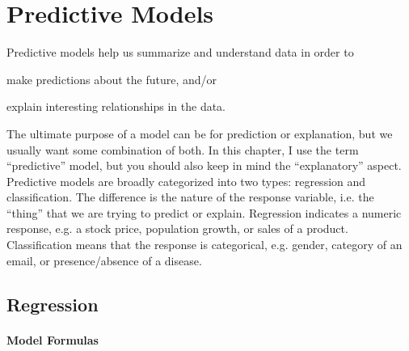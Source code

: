 \chapter{Predictive Models}
Predictive models help us summarize and understand data in order to
\begin{inparaenum}[1)] \item
make predictions about the future, and/or \item explain interesting
relationships in the data. 
\end{inparaenum}
The ultimate purpose of a model can be for
prediction or explanation, but we usually want some combination of
both. In this chapter, I use the term ``predictive'' model, but you
should also keep in mind the ``explanatory'' aspect.  Predictive
models are broadly categorized into two types: regression and
classification.  The difference is the nature of the response
variable, i.e.  the ``thing'' that we are trying to predict or
explain.  Regression indicates a numeric response, e.g. a stock price,
population growth, or sales of a product. Classification means that
the response is categorical, e.g. gender, category of an email, or
presence/absence of a disease.

\section{Regression}

\subsubsection*{Model Formulas}

